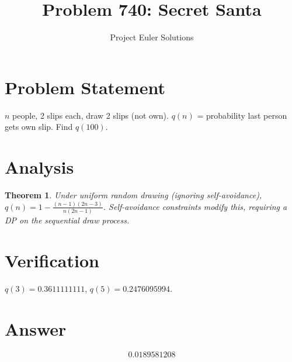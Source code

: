 \documentclass[11pt]{article}
\title{Problem 740: Secret Santa}
\author{Project Euler Solutions}
\date{}
\newtheorem{theorem}{Theorem}
\begin{document}
\maketitle


\section{Problem Statement}
$n$ people, 2 slips each, draw 2 slips (not own). $q(n)$ = probability last person gets own slip. Find $q(100)$.

\section{Analysis}
\begin{theorem}
Under uniform random drawing (ignoring self-avoidance), $q(n) = 1 - \frac{(n-1)(2n-3)}{n(2n-1)}$. Self-avoidance constraints modify this, requiring a DP on the sequential draw process.
\end{theorem}

\section{Verification}
$q(3) = 0.3611111111$, $q(5) = 0.2476095994$.

\section{Answer}

\[
\boxed{0.0189581208}
\]
\end{document}
